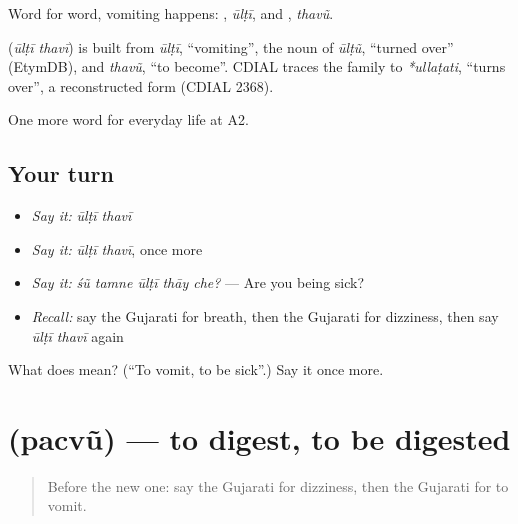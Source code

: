 Word for word, vomiting happens: \textbf{}, \emph{ūlṭī}, and \textbf{}, \emph{thavũ}.

\begin{cousinweb}
\textbf{ } (\emph{ūlṭī thavī}) is built from \emph{ūlṭī}, \textquotedblleft{}vomiting\textquotedblright{}, the noun of \emph{ūlṭũ}, \textquotedblleft{}turned over\textquotedblright{} (EtymDB), and \emph{thavũ}, \textquotedblleft{}to become\textquotedblright{}. CDIAL traces the family to \emph{*ullaṭati}, \textquotedblleft{}turns over\textquotedblright{}, a reconstructed form (CDIAL 2368).
\end{cousinweb}

\begin{grammarlens}[title={What you've built}]
One more word for everyday life at A2.
\end{grammarlens}

\subsection*{Your turn}
\begin{itemize}
\raggedright
  \item \emph{Say it:} \emph{ūlṭī thavī}
  \item \emph{Say it:} \emph{ūlṭī thavī}, once more
  \item \emph{Say it:} \emph{śũ tamne ūlṭī thāy che?} — Are you being sick?
  \item \emph{Recall:} say the Gujarati for breath, then the Gujarati for dizziness, then say \emph{ūlṭī thavī} again
\end{itemize}

\begin{tcolorbox}[breakable,colback=teal!4,colframe=teal!35!black,title={Before you move on}]
What does   mean? (\textquotedblleft{}To vomit, to be sick\textquotedblright{}.) Say it once more.
\end{tcolorbox}
\section[\texorpdfstring{\gu{પચવું} (pacvũ)}{પચવું (pacvũ)}]{ (pacvũ) — to digest, to be digested}

\label{lesson:GU-C225-pacvu}



\begin{quote}
Before the new one: say the Gujarati for dizziness, then the Gujarati for to vomit.
\end{quote}

